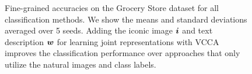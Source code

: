
\begin{figure}[t]
	\centering
	\setlength{\figwidth}{0.62\textwidth}
	\setlength{\figheight}{.22\textheight}
	
	\vspace{-2mm}
	\caption{Fine-grained accuracies on the Grocery Store dataset for all classification methods. We show the means and standard deviations averaged over 5 seeds. Adding the iconic image ${\bm{i}}$ and text description ${\bm{w}}$ for learning joint representations with VCCA improves the classification performance over approaches that only utilize the natural images and class labels.}
	\label{fig:fine_grained_classification_results}
	\vspace{-3mm}
\end{figure}


